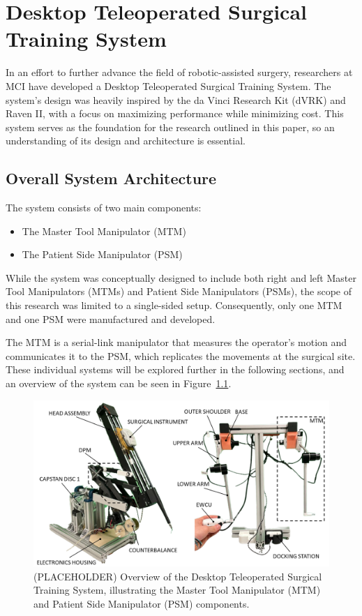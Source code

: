\chapter{Desktop Teleoperated Surgical Training System}

In an effort to further advance the field of robotic-assisted surgery, researchers at MCI have developed a Desktop Teleoperated Surgical Training System. The system's design was heavily inspired by the da Vinci Research Kit (dVRK) and Raven II, with a focus on maximizing performance while minimizing cost. This system serves as the foundation for the research outlined in this paper, so an understanding of its design and architecture is essential.

\section{Overall System Architecture}

The system consists of two main components:

\begin{itemize}
    \item The Master Tool Manipulator (MTM)
    \item The Patient Side Manipulator (PSM)
\end{itemize}

While the system was conceptually designed to include both right and left Master Tool Manipulators (MTMs) and Patient Side Manipulators (PSMs), the scope of this research was limited to a single-sided setup. Consequently, only one MTM and one PSM were manufactured and developed.

The MTM is a serial-link manipulator that measures the operator's motion and communicates it to the PSM, which replicates the movements at the surgical site. These individual systems will be explored further in the following sections, and an overview of the system can be seen in Figure~\ref{fig:system_overview}.

\begin{figure}[htb!] %
    \centering
    \includegraphics[width=1.0\linewidth]{figures/design/system_overview.png}
    \caption{(PLACEHOLDER) Overview of the Desktop Teleoperated Surgical Training System, illustrating the Master Tool Manipulator (MTM) and Patient Side Manipulator (PSM) components.}
    \label{fig:system_overview} %
\end{figure}


